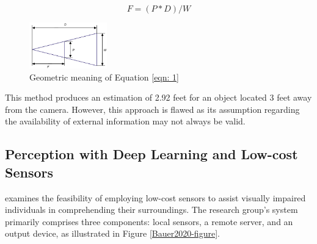 \documentclass{article} %
\begin{document}
\begin{equation}
\label{eqn: 1}
F = (P*D)/W
\end{equation}


\begin{figure}[h]
\begin{center}
\includegraphics[width=0.3\textwidth]{Figs/triaSimi.png}
\end{center}
\caption{Geometric meaning of Equation \ref{eqn: 1}}
\label{triaSimi}
\end{figure}

This method produces an estimation of 2.92 feet for an object located 3 feet away from the camera. However, this approach is flawed as its assumption regarding the availability of external information may not always be valid.

\subsection{Perception with Deep Learning and Low-cost Sensors}

\cite{Bauer2020} examines the feasibility of employing low-cost sensors to assist visually impaired individuals in comprehending their surroundings. The research group's system primarily comprises three components: local sensors, a remote server, and an output device, as illustrated in Figure \ref{Bauer2020-figure}.
\end{document}
